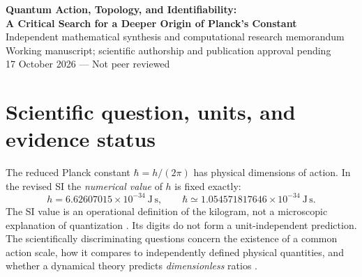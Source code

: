 \documentclass[11pt,a4paper]{article}
\newcommand{\h}{\hbar}
\begin{document}
\begin{center}
{\Large\bf Quantum Action, Topology, and Identifiability:}\\[2mm]
{\large\bf A Critical Search for a Deeper Origin of Planck's Constant}\\[5mm]
{\normalsize Independent mathematical synthesis and computational research memorandum}\\[2mm]
{\small Working manuscript; scientific authorship and publication approval pending}\\[1mm]
{\small 17 October 2026 --- Not peer reviewed}
\end{center}
\begin{abstract}
We ask what the structure of quantum theory, symplectic geometry, topology, phase information, and gravitational models actually explains about Planck's constant. We separate three inequivalent tasks: deriving quantum noncommutativity, selecting a physical quantum-action scale, and explaining the decimal value fixed by SI units. We derive precise obstructions to the stronger task under common assumptions. The regular Weyl canonical commutation relations possess models for all positive $\h$; canonical cotangent-bundle symplectic forms on $T^*(S^3/\Gamma)$ are exact, so their prequantization does not discretize $\h$; discrete flat line-bundle holonomies and harmonic selection rules label topological sectors without calibrating action. We further establish an exact amplitude--$\h$ nonidentifiability for covariance models of the form $N+\h A K_\Gamma$. Conversely, the Weil condition on a \emph{fixed non-exact symplectic form} and independently normalized interference action show what sorts of additional hypotheses can constrain a quantum scale. A published proposal to derive $\h$ from spinorial phase winding is evaluated by dimensional and representation-theoretic counterchecks. We provide a reproducible code suite with 9,886 finite-dimensional/numerical checks. The results are structural and operational; they do not constitute a derivation of the observed numerical value of $\h$ or a new fundamental physical law.
\end{abstract}
\tableofcontents
\section{Scientific question, units, and evidence status}
The reduced Planck constant $\h=h/(2\pi)$ has physical dimensions of action. In the revised SI the \emph{numerical value} of $h$ is fixed exactly:
\begin{equation}\label{eq:si}
 h=6.62607015\times10^{-34}\ \mathrm{J\,s},\qquad
 \h\simeq 1.054571817646\times10^{-34}\ \mathrm{J\,s}.
\end{equation}
The SI value is an operational definition of the kilogram, not a microscopic explanation of quantization \cite{NIST-SI,NIST-kibble}. Its digits do not form a unit-independent prediction. The scientifically discriminating questions concern the existence of a common action scale, how it compares to independently defined physical quantities, and whether a dynamical theory predicts \emph{dimensionless} ratios \cite{DuffOkunVeneziano,CODATA}.
\end{document}
